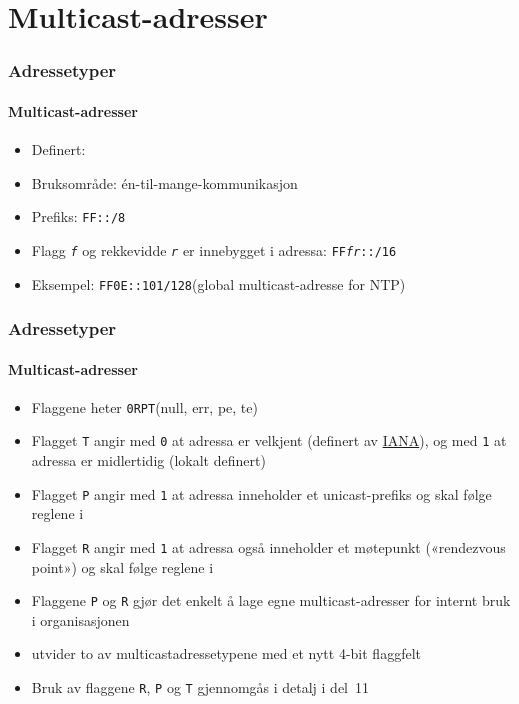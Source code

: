 \section{Multicast-adresser}
\begin{frame}%
  \frametitle{Adressetyper}
  \framesubtitle{Multicast-adresser}
  \begin{itemize}%
  \item Definert: 
  \item Bruksområde: én-til-mange-kommunikasjon
  \item Prefiks: \texttt{FF::/8}
  \item Flagg \texttt{\textit{f\/}} og rekkevidde
    \texttt{\textit{r\/}} er innebygget i adressa:
    \texttt{FF\textit{fr}::/16}
  \item Eksempel: \texttt{FF0E::101/128}\hfill(global multicast-adresse
    for NTP)
  \end{itemize}
\end{frame}

\begin{frame}%
  \frametitle{Adressetyper}
  \framesubtitle{Multicast-adresser}
  \begin{itemize}%
  \item Flaggene heter \texttt{0RPT}\hfill(null, err, pe, te)
  \item Flagget \texttt{T} angir med \texttt{0} at adressa er velkjent
    (definert av \href{http://www.iana.org/}{IANA}), og med \texttt{1}
    at adressa er midlertidig (lokalt definert)
  \item Flagget \texttt{P} angir med \texttt{1} at adressa inneholder
    et unicast-prefiks og skal følge reglene i 
  \item Flagget \texttt{R} angir med \texttt{1} at adressa også
    inneholder et møtepunkt («rendezvous point») og skal følge reglene
    i 
  \item Flaggene \texttt{P} og \texttt{R} gjør det enkelt å lage egne
    multicast-adresser for internt bruk i organisasjonen
  \item {} utvider to av multicastadressetypene med et nytt
    4-bit flaggfelt
  \item Bruk av flaggene \texttt{R}, \texttt{P} og \texttt{T}
    gjennomgås i detalj i del~11
  \end{itemize}
\end{frame}

